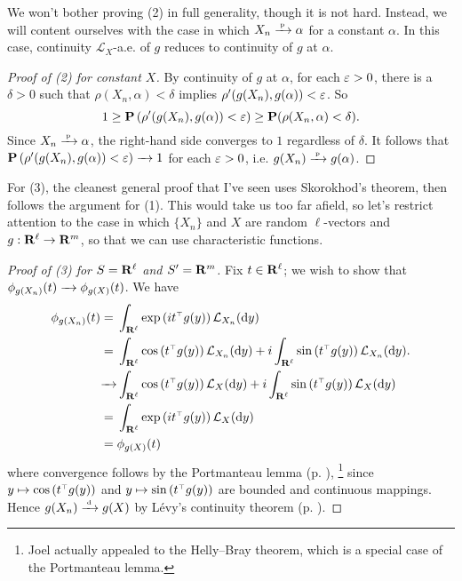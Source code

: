 \documentclass[11pt,letterpaper,reqno,oneside]{article}
\begin{document}
We won't bother proving (2) in full generality, though it is not hard. Instead, we will content ourselves with the case in which $X_n \xrightarrow{{\scriptscriptstyle \mathrm{\;p\;}}} \alpha$ for a constant $\alpha$. In this case, continuity $\mathcal{L}_X$-a.e. of $g$ reduces to continuity of $g$ at $\alpha$.

\begin{proof}[Proof of (2) for constant $X$]
	By continuity of $g$ at $\alpha$, for each $\varepsilon>0$, there is a $\delta>0$ such that $\rho(X_n,\alpha)<\delta$ implies $\rho'(g(X_n),g(\alpha))<\varepsilon$. So
	\begin{equation*}
		1
		\geq \mathbf{P}\left( \rho'(g(X_n),g(\alpha)) < \varepsilon \right) 
		\geq \mathbf{P}( \rho(X_n,\alpha) < \delta ) .
	\end{equation*}
	Since $X_n \xrightarrow{{\scriptscriptstyle \mathrm{\;p\;}}} \alpha$, the right-hand side converges to $1$ regardless of $\delta$. It follows that $\mathbf{P}\left( \rho'(g(X_n),g(\alpha)) < \varepsilon \right) \xrightarrow{\;\;\;} 1$ for each $\varepsilon>0$, i.e. $g(X_n) \xrightarrow{{\scriptscriptstyle \mathrm{\;p\;}}} g(\alpha)$.
\end{proof}


For (3), the cleanest general proof that I've seen uses Skorokhod's theorem, then follows the argument for (1). This would take us too far afield, so let's restrict attention to the case in which $\{ X_n\}$ and $X$ are random $\ell$-vectors and $g : \mathbf{R}^\ell \to \mathbf{R}^m$, so that we can use characteristic functions.

\begin{proof}[Proof of (3) for $S=\mathbf{R}^\ell$ and $S'=\mathbf{R}^m$]
	\label{proof:CMT_3}
	Fix $t \in \mathbf{R}^\ell$; we wish to show that $\phi_{g(X_n)}(t) \xrightarrow{\;\;\;} \phi_{g(X)}(t)$. We have
	\begin{align*}
		\phi_{g(X_n)}(t)
		={}& \int_{\mathbf{R}^\ell} \exp\left( i t^{\scriptscriptstyle \top} g(y) \right) \mathcal{L}_{X_n}( \mathrm{d} y )
		\\
		={}& \int_{\mathbf{R}^\ell} \cos\left( t^{\scriptscriptstyle \top} g(y) \right) \mathcal{L}_{X_n}( \mathrm{d} y ) 
		+ i \int_{\mathbf{R}^\ell} \sin\left( t^{\scriptscriptstyle \top} g(y) \right) \mathcal{L}_{X_n}( \mathrm{d} y ) .
		\\
		\xrightarrow{\;\;\;}& \int_{\mathbf{R}^\ell} \cos\left( t^{\scriptscriptstyle \top} g(y) \right) \mathcal{L}_X( \mathrm{d} y ) 
		+ i \int_{\mathbf{R}^\ell} \sin\left( t^{\scriptscriptstyle \top} g(y) \right) \mathcal{L}_X( \mathrm{d} y ) 
		\\
		={}& \int_{\mathbf{R}^\ell} \exp\left( i t^{\scriptscriptstyle \top} g(y) \right) \mathcal{L}_X( \mathrm{d} y )
		\\
		={}& \phi_{g(X)}(t) 
	\end{align*}
	where convergence follows by the Portmanteau lemma (p. \pageref{lemma:Portmanteau}),%
		\footnote{Joel actually appealed to the Helly--Bray theorem, which is a special case of the Portmanteau lemma.}
	since $y \mapsto \cos\left( t^{\scriptscriptstyle \top} g(y) \right)$ and $y \mapsto \sin\left( t^{\scriptscriptstyle \top} g(y) \right)$ are bounded and continuous mappings. Hence $g(X_n) \xrightarrow{{\scriptscriptstyle \mathrm{\;d\;}}} g(X)$ by Lévy's continuity theorem (p. \pageref{theorem:Levys_continuity_theorem}).
\end{proof}
\end{document}
